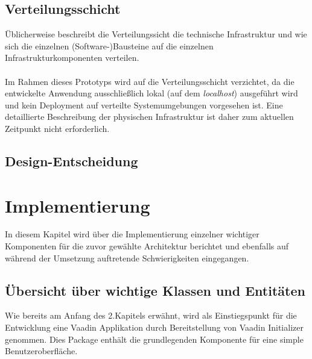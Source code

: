 \documentclass[a4paper,12pt]{scrreprt}
\begin{document}
\section*{\large \textbf{Verteilungsschicht}}
Üblicherweise beschreibt die Verteilungssicht die technische Infrastruktur und wie sich die einzelnen (Software-)Bausteine auf die einzelnen Infrastrukturkomponenten verteilen.\\ \\
Im Rahmen dieses Prototyps wird auf die Verteilungsschicht verzichtet, da die entwickelte Anwendung ausschließlich lokal (auf dem \textit{localhost}) ausgeführt wird und kein Deployment auf verteilte Systemumgebungen vorgesehen ist. Eine detaillierte Beschreibung der physischen Infrastruktur ist daher zum aktuellen Zeitpunkt nicht erforderlich.


\clearpage
\section{Design-Entscheidung}
	
	
\chapter{Implementierung}
In diesem Kapitel wird über die Implementierung einzelner wichtiger Komponenten für die zuvor gewählte Architektur berichtet und ebenfalls auf während der Umsetzung auftretende Schwierigkeiten eingegangen. 
\section{Übersicht über wichtige Klassen und Entitäten}
Wie bereits am Anfang des 2.Kapitels erwähnt, wird als Einstiegspunkt für die Entwicklung eine Vaadin Applikation durch Bereitstellung von Vaadin Initializer genommen. Dies Package enthält die grundlegenden Komponente für eine simple Benutzeroberfläche. 
	
\end{document}
